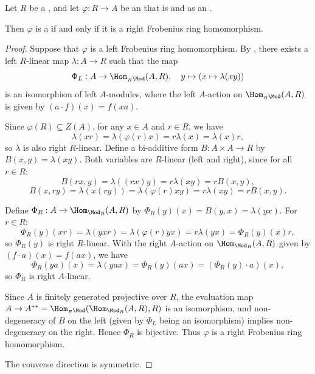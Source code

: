 \begin{theorem} \label{theorem:finitely_generated_projective_algebra_over_a_ring_is_left_frobenius_if_and_only_if_right_frobenius}
    Let $R$ be a , and let $\varphi: R \to A$ be an  that is  and  as an .

    Then $\varphi$ is a  if and only if it is a right Frobenius ring homomorphism.
\end{theorem}
\begin{proof}
    Suppose that $\varphi$ is a left Frobenius ring homomorphism. By , there exists a left $R$-linear map $\lambda: A \to R$ such that the map
    $$\Phi_L: A \to \Hom_{{}_R\Mod}(A,R), \quad y \mapsto (x \mapsto \lambda(xy))$$
    is an isomorphism of left $A$-modules, where the left $A$-action on $\Hom_{{}_R\Mod}(A,R)$ is given by $(a \cdot f)(x) = f(xa)$.

    Since $\varphi(R) \subseteq Z(A)$, for any $x \in A$ and $r \in R$, we have
    $$\lambda(xr) = \lambda(\varphi(r)x) = r\lambda(x) = \lambda(x)r,$$
    so $\lambda$ is also right $R$-linear. Define a bi-additive form $B: A \times A \to R$ by $B(x,y) = \lambda(xy)$. Both variables are $R$-linear (left and right), since for all $r \in R$:
    $$B(rx,y) = \lambda((rx)y) = r\lambda(xy) = rB(x,y),$$
    $$B(x,ry) = \lambda(x(ry)) = \lambda(\varphi(r)xy) = r\lambda(xy) = rB(x,y).$$

    Define $\Phi_R: A \to \Hom_{\Mod_R}(A,R)$ by $\Phi_R(y)(x) = B(y,x) = \lambda(yx)$. For $r \in R$:
    $$\Phi_R(y)(xr) = \lambda(yxr) = \lambda(\varphi(r)y x) = r\lambda(yx) = \Phi_R(y)(x)r,$$
    so $\Phi_R(y)$ is right $R$-linear. With the right $A$-action on $\Hom_{\Mod_R}(A,R)$ given by $(f \cdot a)(x) = f(ax)$, we have
    $$\Phi_R(ya)(x) = \lambda(yax) = \Phi_R(y)(ax) = (\Phi_R(y) \cdot a)(x),$$
    so $\Phi_R$ is right $A$-linear.

    Since $A$ is finitely generated projective over $R$, the evaluation map $A \to A^{**} = \Hom_{{}_R\Mod}(\Hom_{\Mod_R}(A,R), R)$ is an isomorphism, and non-degeneracy of $B$ on the left (given by $\Phi_L$ being an isomorphism) implies non-degeneracy on the right. Hence $\Phi_R$ is bijective. Thus $\varphi$ is a right Frobenius ring homomorphism.

    The converse direction is symmetric.
\end{proof}
